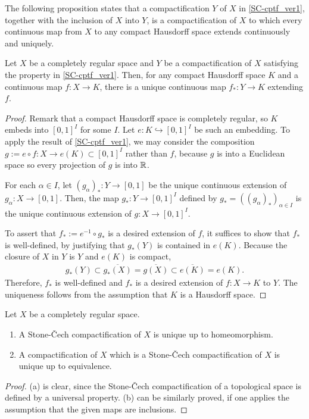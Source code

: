 The following proposition states that a compactification $Y$ of $X$ in \cref{SC-cptf_ver1}, together with the inclusion of $X$ into $Y$, is a compactification of $X$ to which every continuous map from $X$ to any compact Hausdorff space extends continuously and uniquely.
\begin{prop}
    Let $X$ be a completely regular space and $Y$ be a compactification of $X$ satisfying the property in \cref{SC-cptf_ver1}.
    Then, for any compact Hausdorff space $K$ and a continuous map $f: X\rightarrow K$, there is a unique continuous map $f_*: Y\rightarrow K$ extending $f$.
\end{prop}
\begin{proof}
    Remark that a compact Hausdorff space is completely regular, so $K$ embeds into $[0, 1]^I$ for some $I$.
    Let $e: K\hookrightarrow[0, 1]^I$ be such an embedding.
    To apply the result of \cref{SC-cptf_ver1}, we may consider the composition $g:=e\circ f: X\rightarrow e(K)\subset[0, 1]^I$ rather than $f$, because $g$ is into a Euclidean space so every projection of $g$ is into ${\mathbb{R}}$.
    
    For each $\alpha\in I$, let $(g_\alpha)_*: Y\rightarrow[0, 1]$ be the unique continuous extension of $g_\alpha: X\rightarrow[0, 1]$.
    Then, the map $g_*: Y\rightarrow[0, 1]^I$ defined by $g_*=((g_\alpha)_*)_{\alpha\in I}$ is the unique continuous extension of $g: X\rightarrow[0, 1]^I$.
    
    To assert that $f_*:=e^{-1}\circ g_*$ is a desired extension of $f$, it suffices to show that $f_*$ is well-defined, by justifying that $g_*(Y)$ is contained in $e(K)$.
    Because the closure of $X$ in $Y$ is $Y$ and $e(K)$ is compact,
    \begin{align*}
        g_*(Y)\subset\overline{g_*(X)}=\overline{g(X)}\subset\overline{e(K)}=e(K).
    \end{align*}
    Therefore, $f_*$ is well-defined and $f_*$ is a desired extension of $f: X\rightarrow K$ to $Y$.
    The uniqueness follows from the assumption that $K$ is a Hausdorff space.
\end{proof}

\begin{prop}
    Let $X$ be a completely regular space.
    \begin{enumerate}
        \item[(a)]
        {
            A Stone-\v{C}ech compactification of $X$ is unique up to homeomorphism.
        }
        \item[(b)]
        {
            A compactification of $X$ which is a Stone-\v{C}ech compactification of $X$ is unique up to equivalence.
        }
    \end{enumerate}
\end{prop}
\begin{proof}
    (a) is clear, since the Stone-\v{C}ech compactification of a topological space is defined by a universal property.
    (b) can be similarly proved, if one applies the assumption that the given maps are inclusions.
\end{proof}

